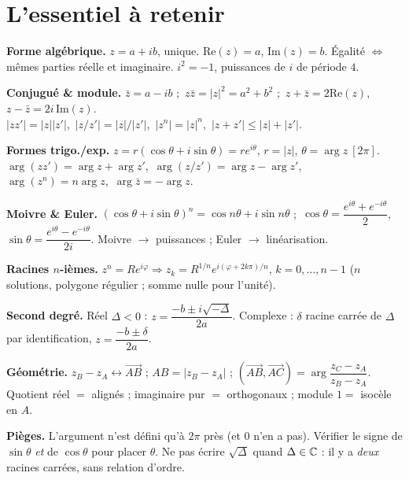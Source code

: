 \section{L'essentiel à retenir}

\begin{synthese}
\textbf{Forme algébrique.} $z=a+ib$, unique. $\mathrm{Re}(z)=a$, $\mathrm{Im}(z)=b$. Égalité
$\iff$ mêmes parties réelle et imaginaire. $i^{2}=-1$, puissances de $i$ de période $4$.

\smallskip
\textbf{Conjugué \& module.} $\bar z=a-ib$ ;\ $z\bar z=|z|^{2}=a^{2}+b^{2}$ ;\
$z+\bar z=2\mathrm{Re}(z)$,\ $z-\bar z=2i\,\mathrm{Im}(z)$. \\
$|zz'|=|z||z'|$,\ $|z/z'|=|z|/|z'|$,\ $|z^{n}|=|z|^{n}$,\ $|z+z'|\le|z|+|z'|$.

\smallskip
\textbf{Formes trigo./exp.} $z=r(\cos\theta+i\sin\theta)=re^{i\theta}$, $r=|z|$,
$\theta=\arg z\ [2\pi]$. \\
$\arg(zz')=\arg z+\arg z'$,\ $\arg(z/z')=\arg z-\arg z'$,\ $\arg(z^{n})=n\arg z$,\
$\arg\bar z=-\arg z$.

\smallskip
\textbf{Moivre \& Euler.} $(\cos\theta+i\sin\theta)^{n}=\cos n\theta+i\sin n\theta$ ;\
$\cos\theta=\dfrac{e^{i\theta}+e^{-i\theta}}2$,\ $\sin\theta=\dfrac{e^{i\theta}-e^{-i\theta}}{2i}$.
Moivre $\to$ puissances ; Euler $\to$ linéarisation.

\smallskip
\textbf{Racines $n$-ièmes.} $z^{n}=Re^{i\varphi}\Rightarrow z_k=R^{1/n}e^{i(\varphi+2k\pi)/n}$,
$k=0,\dots,n-1$ ($n$ solutions, polygone régulier ; somme nulle pour l'unité).

\smallskip
\textbf{Second degré.} Réel $\Delta<0$ : $z=\dfrac{-b\pm i\sqrt{-\Delta}}{2a}$. Complexe : $\delta$
racine carrée de $\Delta$ par identification, $z=\dfrac{-b\pm\delta}{2a}$.

\smallskip
\textbf{Géométrie.} $z_B-z_A\leftrightarrow\overrightarrow{AB}$ ; $AB=|z_B-z_A|$ ;
$(\overrightarrow{AB},\overrightarrow{AC})=\arg\dfrac{z_C-z_A}{z_B-z_A}$. Quotient réel $=$
alignés ; imaginaire pur $=$ orthogonaux ; module $1=$ isocèle en $A$.

\smallskip
\textbf{Pièges.} L'argument n'est défini qu'à $2\pi$ près (et $0$ n'en a pas). Vérifier le signe de
$\sin\theta$ \emph{et} de $\cos\theta$ pour placer $\theta$. Ne pas écrire $\sqrt{\Delta}$ quand
$\Delta\in\mathbb{C}$ : il y a \emph{deux} racines carrées, sans relation d'ordre.
\end{synthese}


